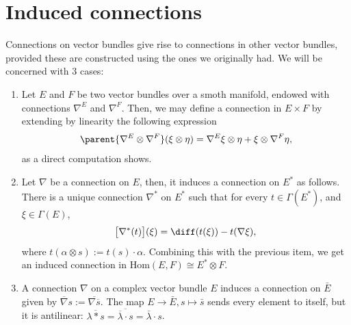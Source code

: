 
\section{Induced connections} \label{sec_induced_connections}
Connections on vector bundles give rise to connections in other vector bundles, provided these are constructed using the ones we originally had. We will be concerned with 3 cases:
\begin{enumerate}
    \item Let \(E\) and \(F\) be two vector bundles over a smoth manifold, endowed with connections \(\nabla^E\) and \(\nabla^F\). Then, we may define a connection in \(E \times F\) by extending by linearity the following expression
    \begin{equation} \label{def_connection_product}
    \parent{\nabla^E \otimes \nabla^F}(\xi \otimes \eta)=\nabla^E \xi \otimes \eta + \xi \otimes \nabla^F \eta,
    \end{equation}
    as a direct computation shows.
    \item Let \(\nabla\) be a connection on \(E\), then, it induces a connection on \(E^*\) as follows. There is a unique connection \(\nabla^*\) on \(E^*\) such that for every \(t \in \Gamma(E^*)\), and \(\xi \in \Gamma(E)\), 
    \begin{equation} \label{def_connection_dual}
        \big[\nabla^*(t) \big](\xi) = \diff (t (\xi)) - t(\nabla \xi),
    \end{equation}
    where \(t(\alpha \otimes s):=t(s) \cdot \alpha\). Combining this with the previous item, we get an induced connection in \(\mathrm{Hom}(E, F)\cong E^*\otimes F\).
    \item A connection \(\nabla\) on a complex vector bundle \(E\) induces a connection on \(\bar{E}\) given by \(\overline{\nabla} s:=\overline{\nabla \overline{s}}\). The map \(E \to \bar{E}, s \mapsto \bar{s}\) sends every element to itself, but it is antilinear: \(\overline{\lambda *s}=\overline{\overline{\lambda}\cdot s}=\bar{\lambda} \cdot s\).
\end{enumerate}

